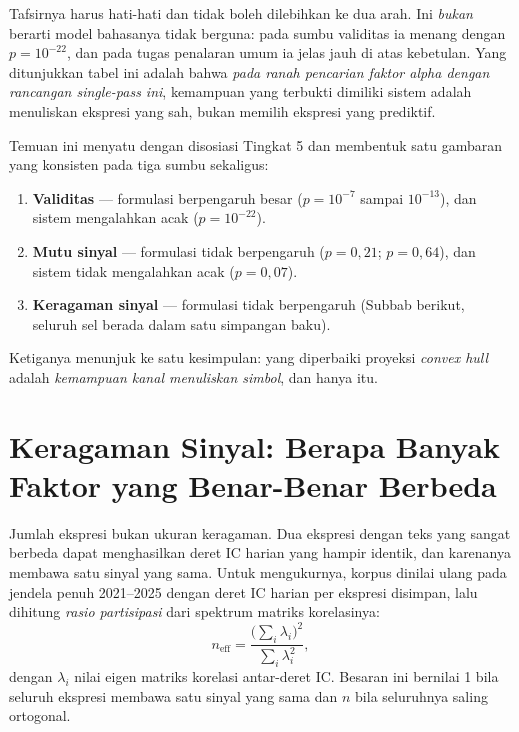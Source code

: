 \documentclass{laporanta1statugm}
\begin{document}
Tafsirnya harus hati-hati dan tidak boleh dilebihkan ke dua arah. Ini
\emph{bukan} berarti model bahasanya tidak berguna: pada sumbu validitas ia
menang dengan $p = 10^{-22}$, dan pada tugas penalaran umum ia jelas jauh di
atas kebetulan. Yang ditunjukkan tabel ini adalah bahwa \emph{pada ranah
pencarian faktor alpha dengan rancangan single-pass ini}, kemampuan yang
terbukti dimiliki sistem adalah menuliskan ekspresi yang sah, bukan memilih
ekspresi yang prediktif.

Temuan ini menyatu dengan disosiasi Tingkat 5 dan membentuk satu gambaran yang
konsisten pada tiga sumbu sekaligus:

\begin{enumerate}
  \item \textbf{Validitas} --- formulasi berpengaruh besar
        ($p = 10^{-7}$ sampai $10^{-13}$), dan sistem mengalahkan acak
        ($p = 10^{-22}$).
  \item \textbf{Mutu sinyal} --- formulasi tidak berpengaruh
        ($p = 0{,}21$; $p = 0{,}64$), dan sistem tidak mengalahkan acak
        ($p = 0{,}07$).
  \item \textbf{Keragaman sinyal} --- formulasi tidak berpengaruh (Subbab
        berikut, seluruh sel berada dalam satu simpangan baku).
\end{enumerate}

Ketiganya menunjuk ke satu kesimpulan: yang diperbaiki proyeksi \textit{convex
hull} adalah \emph{kemampuan kanal menuliskan simbol}, dan hanya itu.

\section{Keragaman Sinyal: Berapa Banyak Faktor yang Benar-Benar Berbeda}

Jumlah ekspresi bukan ukuran keragaman. Dua ekspresi dengan teks yang sangat
berbeda dapat menghasilkan deret IC harian yang hampir identik, dan karenanya
membawa satu sinyal yang sama. Untuk mengukurnya, korpus dinilai ulang pada
jendela penuh 2021--2025 dengan deret IC harian per ekspresi disimpan, lalu
dihitung \emph{rasio partisipasi} dari spektrum matriks korelasinya:
\begin{equation}
  n_{\text{eff}} = \frac{\bigl(\sum_i \lambda_i\bigr)^2}{\sum_i \lambda_i^2},
  \label{eq:neff}
\end{equation}
dengan $\lambda_i$ nilai eigen matriks korelasi antar-deret IC. Besaran ini
bernilai 1 bila seluruh ekspresi membawa satu sinyal yang sama dan $n$ bila
seluruhnya saling ortogonal.
\end{document}
